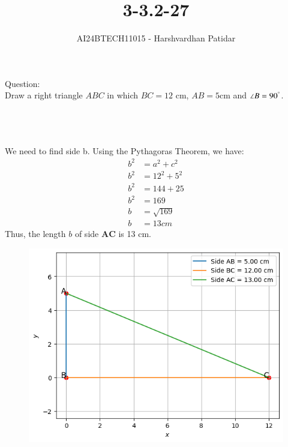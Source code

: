 \documentclass[journal]{IEEEtran}
\begin{document}

\vspace{3cm}

\title{3-3.2-27}
\author{AI24BTECH11015 - Harshvardhan Patidar}
 \maketitle
{\let\newpage\relax\maketitle}

\renewcommand{\thefigure}{\theenumi}
\renewcommand{\thetable}{\theenumi}
\setlength{\intextsep}{10pt} %



\renewcommand{\thetable}{\theenumi}

Question: \\
	Draw a right triangle $ABC$ in which $BC = 12$ cm, $AB = 5$cm and $\angle B = 90^{\degree}$.\\ \\


\solution\\
	 \begin{table}[h!]    
      		\centering
      		
      		\caption{}
	\end{table}\\

	We need to find side b. Using the Pythagoras Theorem, we have:
	\begin{align}
		b^2 &= a^2 + c^2 \\
		b^2 &= 12^2 + 5^2\\
		b^2 &= 144 + 25\\
		b^2 &= 169\\
		b &= \sqrt{169}\\
		b &= 13 cm
	\end{align}
	Thus, the length $b$ of side $\mathbf{AC}$ is 13 cm.

	\begin{figure}[h]
		\centering
		\includegraphics[width=\linewidth]{plots/plot.png}
		\caption{}
       		\label{graph}
    	\end{figure}

	


  
\end{document}
